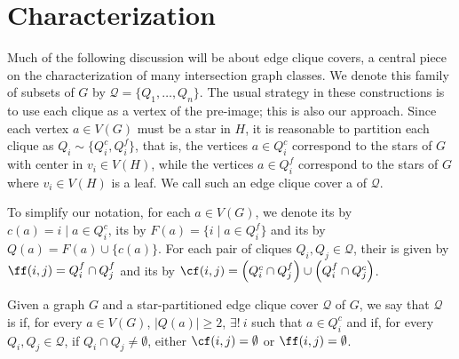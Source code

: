 \section{Characterization}

Much of the following discussion will be about edge clique covers, a central piece on the characterization of many intersection graph classes.
We denote this family of subsets of $G$ by $\mathcal{Q} = \{Q_1, \dots, Q_n\}$.
The usual strategy in these constructions is to use each clique as a vertex of the pre-image; this is also our approach.
Since each vertex $a \in V(G)$ must be a star in $H$, it is reasonable to partition each clique as $Q_i \sim \{Q_i^c, Q_i^f\}$, that is, the vertices $a \in Q_i^c$ correspond to the stars of $G$ with center in $v_i \in V(H)$, while the vertices $a \in Q_i^f$ correspond to the stars of $G$ where $v_i \in V(H)$ is a leaf.
We call such an edge clique cover a  of $\mathcal{Q}$.

To simplify our notation, for each $a \in V(G)$, we denote its  by $c(a) = i \mid a \in Q_i^c$, its  by $F(a) = \{i \mid a \in Q_i^f\}$ and its  by $Q(a) = F(a) \cup \{c(a)\}$. For each pair of cliques $Q_i, Q_j \in \mathcal{Q}$, their  is given by $\ff(i,j) = Q_i^f \cap Q_j^f$ and its  by $\cf(i,j) = \left(Q_i^c \cap Q_j^f\right) \cup \left(Q_i^f \cap Q_j^c\right)$.

\begin{definition}
    Given a graph $G$ and a star-partitioned edge clique cover $\mathcal{Q}$ of $G$, we say that $\mathcal{Q}$ is  if, for every $a \in V(G)$, $|Q(a)| \geq 2$, $\exists!\ i$ such that $a \in Q_i^c$ and if, for every $Q_i, Q_j \in \mathcal{Q}$, if $Q_i \cap Q_j \neq \emptyset$, either $\cf(i,j) = \emptyset$ or $\ff(i,j) = \emptyset$.
\end{definition}

